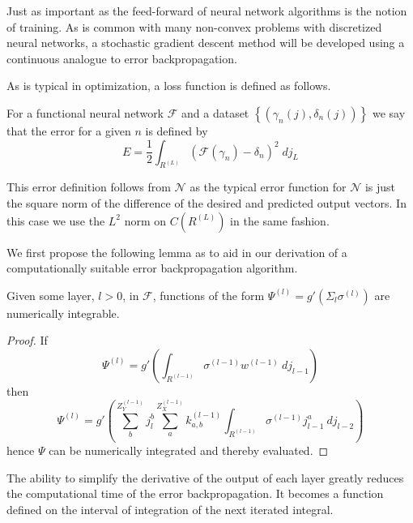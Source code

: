 Just as important as the feed-forward of neural network algorithms is the notion of training. As is common with many non-convex problems with discretized neural networks, a stochastic gradient descent method will be developed using a continuous analogue to error backpropagation. 

As is typical in optimization, a loss function is defined as follows. 
\begin{definition}
    For a functional neural network $\mathcal{F}$ and a dataset $\left\{(\gamma_n(j), \delta_n(j))\right\}$ we say that the error for a given $n$ is defined by
    \begin{equation} \label{eq:error}
        E = \frac12 \int_{R^{(L)}}\left(\mathcal{F}(\gamma_n) - \delta_n \right)^2\;dj_L
    \end{equation}
\end{definition}
This error definition follows from $\mathcal{N}$ as the typical error function for $\mathcal{N}$ is just the square norm of the difference of the desired and predicted output vectors. In this case we use the $L^2$ norm on $C(R^{(L)})$ in the same fashion.

We first propose the following lemma as to aid in our derivation of a computationally suitable error backpropagation algorithm.


\begin{lemma}
Given some layer, $l>0$, in $\mathcal{F}$, functions of the form $\Psi^{(l)} =g'\left(\Sigma_l\sigma^{(l)}\right)$ are numerically integrable. 
\end{lemma}

\begin{proof}
If\begin{equation}\Psi^{(l)}=g'\left(\int_{R^{(l-1)}}{\sigma^{(l-1)} w^{(l-1)}\ dj_{l-1}}\right)\end{equation}
then
\begin{equation}
\Psi^{(l)}=
 g'\left(
   \sum_b^{Z^{(l-1)}_Y} j_{l}^{b}
   \sum_{a}^{Z^{(l-1)}_X} k_{a,b}^{(l-1)}
    \int_{R^{(l-1)}}{\sigma^{(l-1)} j_{l-1}^a \ dj_{l-2}}
  \right)
\end{equation}
hence $\Psi$ can be numerically integrated and thereby evaluated.
\end{proof}

The ability to simplify the derivative of the output of each layer greatly reduces the computational time of the error backpropagation. It becomes a function defined on the interval of integration of the next iterated integral.

